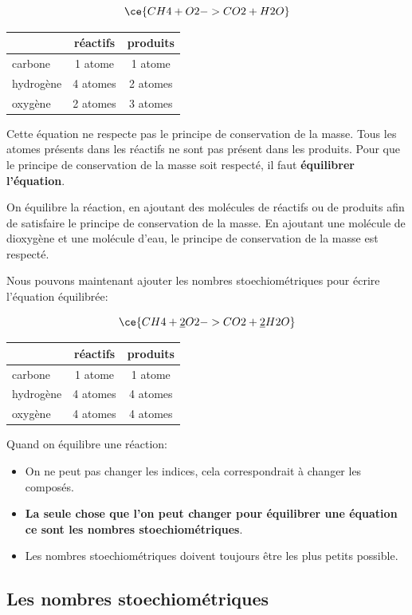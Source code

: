 \documentclass[
  11pt,
  a4paper,
  openany]{book}
\providecommand{\tightlist}{%
  \setlength{\itemsep}{0pt}\setlength{\parskip}{0pt}}
\begin{document}
\[ \ce{CH4 + O2 -> CO2 + H2O} \]

\begin{longtable}[]{@{}lcc@{}}
\toprule()
& réactifs & produits \\
\midrule()
\endhead
carbone & 1 atome & 1 atome \\
hydrogène & 4 atomes & 2 atomes \\
oxygène & 2 atomes & 3 atomes \\
\bottomrule()
\end{longtable}

Cette équation ne respecte pas le principe de conservation de la masse. Tous les atomes présents dans les réactifs ne sont pas présent dans les produits. Pour que le principe de conservation de la masse soit respecté, il faut \textbf{équilibrer l'équation}.

On équilibre la réaction, en ajoutant des molécules de réactifs ou de produits afin de satisfaire le principe de conservation de la masse. En ajoutant une molécule de dioxygène et une molécule d'eau, le principe de conservation de la masse est respecté.

Nous pouvons maintenant ajouter les nombres stoechiométriques pour écrire l'équation équilibrée:

\[ \ce{CH4 + \underline{2} O2 -> CO2 + \underline{2} H2O} \]

\begin{longtable}[]{@{}lcc@{}}
\toprule()
& réactifs & produits \\
\midrule()
\endhead
carbone & 1 atome & 1 atome \\
hydrogène & 4 atomes & 4 atomes \\
oxygène & 4 atomes & 4 atomes \\
\bottomrule()
\end{longtable}

Quand on équilibre une réaction:

\begin{itemize}
\tightlist
\item
  On ne peut pas changer les indices, cela correspondrait à changer les composés.
\item
  \textbf{La seule chose que l'on peut changer pour équilibrer une équation ce sont les nombres stoechiométriques}.
\item
  Les nombres stoechiométriques doivent toujours être les plus petits possible.
\end{itemize}

\hypertarget{les-nombres-stoechiomuxe9triques}{%
\subsection{Les nombres stoechiométriques}\label{les-nombres-stoechiomuxe9triques}}
\end{document}
